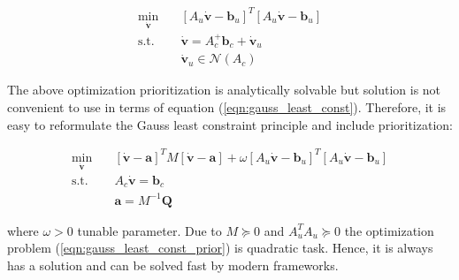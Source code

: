 \begin{equation}
    \begin{aligned}
        \min_{\dot{\mathbf{v}}} \quad & 
        [A_u \dot{\mathbf{v}} - \mathbf{b}_u]^T 
        [A_u \dot{\mathbf{v}} - \mathbf{b}_u]\\
        \textrm{s.t.} \quad & \dot{\mathbf{v}} = A_c^{+} \mathbf{b}_c + 
        \dot{\mathbf{v}}_u \\ 
        \quad & \dot{\mathbf{v}}_u \in \mathcal{N}(A_c)
    \end{aligned}
    \label{eqn:task_prior_null_space}
\end{equation}

The above optimization prioritization is analytically solvable but solution 
is not convenient to use in terms of equation (\ref{eqn:gauss_least_const}). 
Therefore, it is easy to reformulate the Gauss least constraint principle and 
include prioritization:

\begin{equation}
    \begin{aligned}
        \min_{\dot{\mathbf{v}}} \quad &
        [\dot{\mathbf{v}} - \mathbf{a}]^T M [\dot{\mathbf{v}} - \mathbf{a}] +
        \omega 
        [A_u \dot{\mathbf{v}} - \mathbf{b}_u]^T 
        [A_u \dot{\mathbf{v}} - \mathbf{b}_u]\\
        \textrm{s.t.} \quad &
        A_c \dot{\mathbf{v}} = \mathbf{b}_c \\
        &
        \mathbf{a} = M^{-1} \mathbf{Q}
    \end{aligned}
    \label{eqn:gauss_least_const_prior}
\end{equation}

where $\omega > 0$ tunable parameter. Due to $M \succcurlyeq 0 $ and 
$A_u^T A_u \succcurlyeq 0$ the optimization problem 
(\ref{eqn:gauss_least_const_prior}) is quadratic task. Hence, it is always
has a solution and can be solved fast by modern frameworks.
